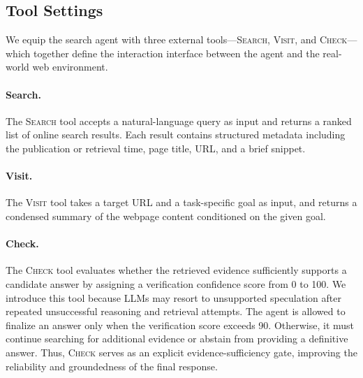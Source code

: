 \documentclass{huawei}
\begin{document}

\subsection{Tool Settings}
We equip the search agent with three external tools—\textsc{Search}, \textsc{Visit}, and \textsc{Check}—which together define the interaction interface between the agent and the real-world web environment.

\paragraph{Search.} The \textsc{Search} tool accepts a natural-language query as input and returns a ranked list of online search results. Each result contains structured metadata including the publication or retrieval time, page title, URL, and a brief snippet. 
\paragraph{Visit.} The \textsc{Visit} tool takes a target URL and a task-specific goal as input, and returns a condensed summary of the webpage content conditioned on the given goal. 
\paragraph{Check.} The \textsc{Check} tool evaluates whether the retrieved evidence sufficiently supports a candidate answer by assigning a verification confidence score from 0 to 100. We introduce this tool because LLMs may resort to unsupported speculation after repeated unsuccessful reasoning and retrieval attempts. The agent is allowed to finalize an answer only when the verification score exceeds 90. Otherwise, it must continue searching for additional evidence or abstain from providing a definitive answer. Thus, \textsc{Check} serves as an explicit evidence-sufficiency gate, improving the reliability and groundedness of the final response.
\end{document}
